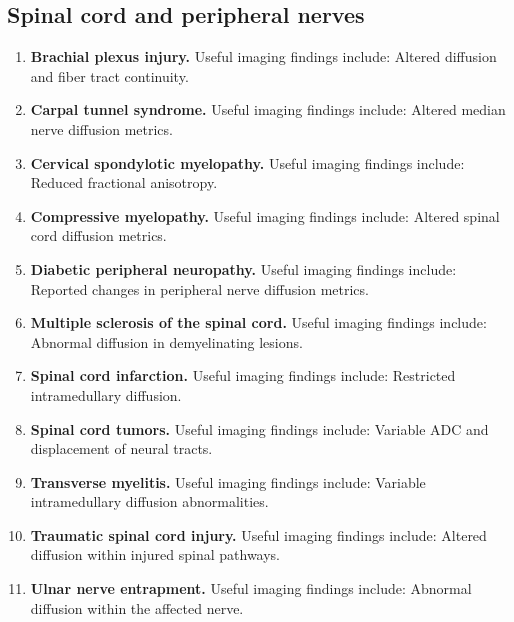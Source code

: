 \subsection{Spinal cord and peripheral nerves}
\begin{enumerate}[leftmargin=*,itemsep=0.45em,topsep=0.4em]
\item \textbf{Brachial plexus injury.} Useful imaging findings include: Altered diffusion and fiber tract continuity.
\item \textbf{Carpal tunnel syndrome.} Useful imaging findings include: Altered median nerve diffusion metrics.
\item \textbf{Cervical spondylotic myelopathy.} Useful imaging findings include: Reduced fractional anisotropy.
\item \textbf{Compressive myelopathy.} Useful imaging findings include: Altered spinal cord diffusion metrics.
\item \textbf{Diabetic peripheral neuropathy.} Useful imaging findings include: Reported changes in peripheral nerve diffusion metrics.
\item \textbf{Multiple sclerosis of the spinal cord.} Useful imaging findings include: Abnormal diffusion in demyelinating lesions.
\item \textbf{Spinal cord infarction.} Useful imaging findings include: Restricted intramedullary diffusion.
\item \textbf{Spinal cord tumors.} Useful imaging findings include: Variable ADC and displacement of neural tracts.
\item \textbf{Transverse myelitis.} Useful imaging findings include: Variable intramedullary diffusion abnormalities.
\item \textbf{Traumatic spinal cord injury.} Useful imaging findings include: Altered diffusion within injured spinal pathways.
\item \textbf{Ulnar nerve entrapment.} Useful imaging findings include: Abnormal diffusion within the affected nerve.
\end{enumerate}


